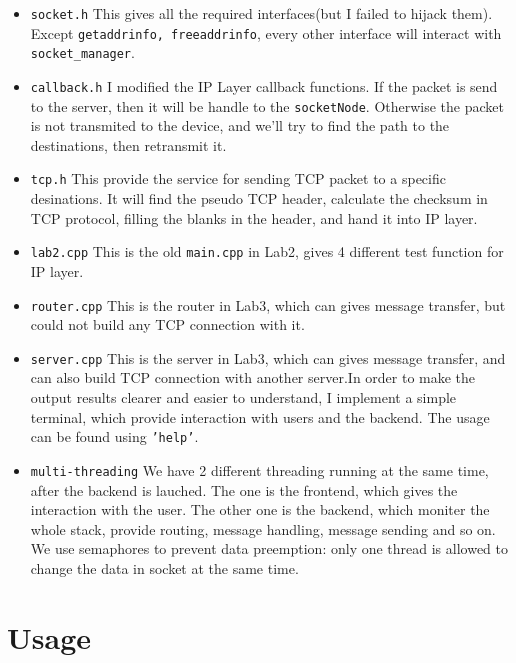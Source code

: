 \documentclass[11pt]{article}
\begin{document}
\begin{itemize}
			\item \texttt{socket.h} This gives all the required interfaces(but I failed to hijack them). Except \texttt{getaddrinfo, freeaddrinfo}, every other interface will interact with \texttt{socket\_manager}.
			
			\item \texttt{callback.h} I modified the IP Layer callback functions. If the packet is send to the server, then it will be handle to the \texttt{socketNode}. Otherwise the packet is not transmited to the device, and we'll try to find the path to the destinations, then retransmit it.
			
			\item \texttt{tcp.h} This provide the service for sending TCP packet to a specific desinations. It will find the pseudo TCP header, calculate the checksum in TCP protocol, filling the blanks in the header, and hand it into IP layer.
			
			\item \texttt{lab2.cpp} This is the old \texttt{main.cpp} in Lab2, gives 4 different test function for IP layer.
			
			\item \texttt{router.cpp} This is the router in Lab3, which can gives message transfer, but could not build any TCP connection with it.
			
			\item \texttt{server.cpp} This is the server in Lab3, which can gives message transfer, and can also build TCP connection with another server.In order to make the output results clearer and easier to understand, I implement a simple terminal, which provide interaction with users and the backend. The usage can be found using \texttt{'help'}.
			
			\item \texttt{multi-threading} We have 2 different threading running at the same time, after the backend is lauched. The one is the frontend, which gives the interaction with the user. The other one is the backend, which moniter the whole stack, provide routing, message handling, message sending and so on. We use semaphores to prevent data preemption: only one thread is allowed to change the data in socket at the same time.
						
		\end{itemize}
		
	
	\section{Usage}
	
\end{document}
